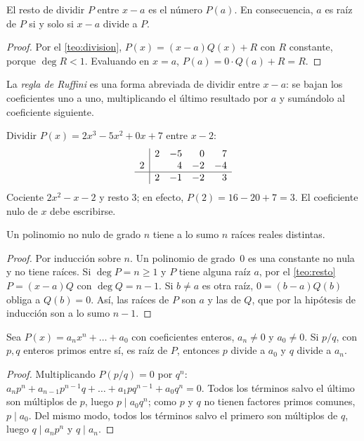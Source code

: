 \begin{teorema}\label{teo:resto}
El resto de dividir $P$ entre $x-a$ es el número $P(a)$. En consecuencia, $a$ es raíz de $P$ si y solo si $x-a$ divide a $P$.
\end{teorema}

\begin{proof}
Por el \cref{teo:division}, $P(x)=(x-a)Q(x)+R$ con $R$ constante, porque $\deg R<1$. Evaluando en $x=a$, $P(a)=0\cdot Q(a)+R=R$.
\end{proof}

La \emph{regla de Ruffini} es una forma abreviada de dividir entre $x-a$: se bajan los coeficientes uno a uno, multiplicando el último resultado por $a$ y sumándolo al coeficiente siguiente.

\begin{ejemplo}\label{ej:ruffini}
Dividir $P(x)=2x^3-5x^2+0x+7$ entre $x-2$:
\[
\begin{array}{r|rrrr}
 & 2 & -5 & 0 & 7\\
2 & & 4 & -2 & -4\\\hline
 & 2 & -1 & -2 & 3
\end{array}
\]
Cociente $2x^2-x-2$ y resto $3$; en efecto, $P(2)=16-20+7=3$. El coeficiente nulo de $x$ debe escribirse.
\end{ejemplo}

\begin{corolario}\label{cor:raices}
Un polinomio no nulo de grado $n$ tiene a lo sumo $n$ raíces reales distintas.
\end{corolario}

\begin{proof}
Por inducción sobre $n$. Un polinomio de grado~0 es una constante no nula y no tiene raíces. Si $\deg P=n\ge1$ y $P$ tiene alguna raíz $a$, por el \cref{teo:resto} $P=(x-a)Q$ con $\deg Q=n-1$. Si $b\neq a$ es otra raíz, $0=(b-a)Q(b)$ obliga a $Q(b)=0$. Así, las raíces de $P$ son $a$ y las de $Q$, que por la hipótesis de inducción son a lo sumo $n-1$.
\end{proof}

\begin{teorema}\label{teo:raices-racionales}
Sea $P(x)=a_nx^n+\dots+a_0$ con coeficientes enteros, $a_n\neq0$ y $a_0\neq0$. Si $p/q$, con $p,q$ enteros primos entre sí, es raíz de $P$, entonces $p$ divide a $a_0$ y $q$ divide a $a_n$.
\end{teorema}

\begin{proof}
Multiplicando $P(p/q)=0$ por $q^n$: $a_np^n+a_{n-1}p^{n-1}q+\dots+a_1pq^{n-1}+a_0q^n=0$. Todos los términos salvo el último son múltiplos de $p$, luego $p\mid a_0q^n$; como $p$ y $q$ no tienen factores primos comunes, $p\mid a_0$. Del mismo modo, todos los términos salvo el primero son múltiplos de $q$, luego $q\mid a_np^n$ y $q\mid a_n$.
\end{proof}

